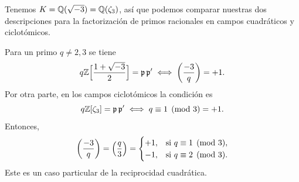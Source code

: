 \begin{ejemplo}
  Tenemos $K = \mathbb{Q} (\sqrt{-3}) = \mathbb{Q} (\zeta_3)$, así que podemos comparar
  nuestras dos descripciones para la factorización de primos racionales en
  campos cuadráticos y ciclotómicos.

  Para un primo $q \ne 2,3$ se tiene
  \[ q \mathbb{Z} \Bigl[\frac{1+\sqrt{-3}}{2}\Bigr] = \mathfrak{p}\,\mathfrak{p}'
     \iff \left(\frac{-3}{q}\right) = +1. \]
  Por otra parte, en los campos ciclotómicos la condición es
  $$q \mathbb{Z} [\zeta_3] = \mathfrak{p}\,\mathfrak{p}' \iff q \equiv 1 \pmod{3} = +1.$$
  Entonces,
  \[ \left(\frac{-3}{q}\right) = \left(\frac{q}{3}\right) = \begin{cases}
    +1, & \text{si }q\equiv 1 \pmod{3},\\
    -1, & \text{si }q\equiv 2 \pmod{3}.
  \end{cases} \]
  Este es un caso particular de la reciprocidad cuadrática.
\end{ejemplo}

